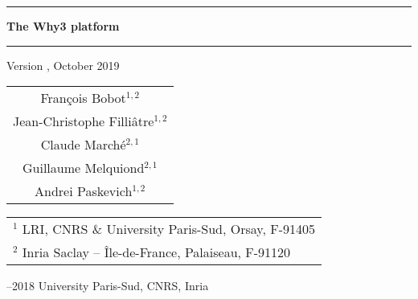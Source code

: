 \documentclass[a4paper,11pt,twoside,openright]{memoir}
\begin{document}
\sloppy

\thispagestyle{empty}

\begin{center}

\rule\textwidth{0.8mm}

\vfill

{
\fontsize{40}{40pt}\selectfont
\bfseries\sffamily The Why3 platform}

\vfill

\rule\textwidth{0.8mm}

\vfill


\begin{LARGE}
  Version \whyversion{}, October 2019
\end{LARGE}

\vfill

\begin{Large}
  \begin{tabular}{c}
  Fran\c{c}ois Bobot$^{1,2}$ \\
  Jean-Christophe Filli\^atre$^{1,2}$  \\
  Claude March\'e$^{2,1}$ \\
  Guillaume Melquiond$^{2,1}$\\
  Andrei Paskevich$^{1,2}$
\end{tabular}
\end{Large}
\vfill

\begin{flushleft}

\begin{tabular}{l}
$^1$ LRI, CNRS \& University Paris-Sud, Orsay, F-91405 \\
$^2$ Inria Saclay -- \^Ile-de-France, Palaiseau, F-91120
\end{tabular}

\bigskip

--2018 University Paris-Sud, CNRS, Inria



\end{flushleft}
\end{center}
\end{document}
